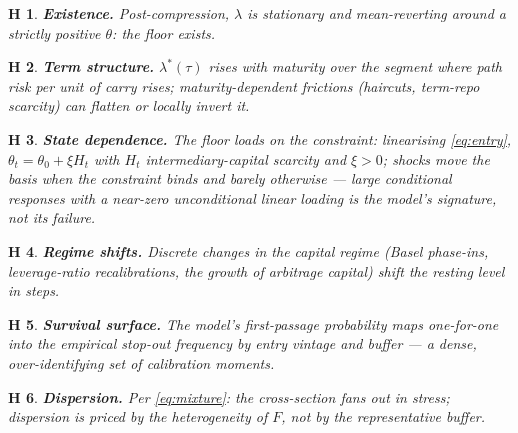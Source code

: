 \documentclass[11pt]{article}
\newtheorem{hypothesis}{H}
\begin{document}
\begin{hypothesis}\textbf{Existence.} Post-compression, $\lambda$ is stationary and mean-reverting around a strictly positive $\theta$: the floor exists.\end{hypothesis}
\begin{hypothesis}\textbf{Term structure.} $\lambda^*(\tau)$ rises with maturity over the segment where path risk per unit of carry rises; maturity-dependent frictions (haircuts, term-repo scarcity) can flatten or locally invert it.\end{hypothesis}
\begin{hypothesis}\textbf{State dependence.} The floor loads on the \emph{constraint}: linearising \eqref{eq:entry}, $\theta_t=\theta_0+\xi H_t$ with $H_t$ intermediary-capital scarcity and $\xi>0$; shocks move the basis \emph{when the constraint binds} and barely otherwise --- large conditional responses with a near-zero unconditional linear loading is the model's signature, not its failure.\end{hypothesis}
\begin{hypothesis}\textbf{Regime shifts.} Discrete changes in the capital regime (Basel phase-ins, leverage-ratio recalibrations, the growth of arbitrage capital) shift the resting level in steps.\end{hypothesis}
\begin{hypothesis}\textbf{Survival surface.} The model's first-passage probability maps one-for-one into the empirical stop-out frequency by entry vintage and buffer --- a dense, over-identifying set of calibration moments.\end{hypothesis}
\begin{hypothesis}\textbf{Dispersion.} Per \eqref{eq:mixture}: the cross-section fans out in stress; dispersion is priced by the heterogeneity of $F$, not by the representative buffer.\end{hypothesis}
\end{document}
